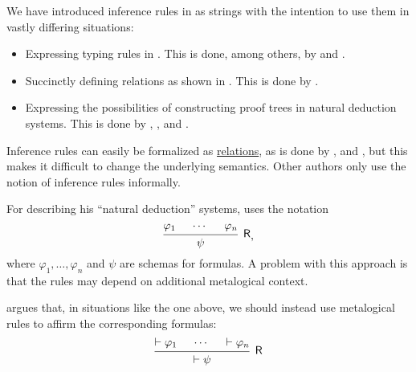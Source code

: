 \begin{remark}\label{rem:inference_rules_semantics}
  We have introduced inference rules in  as strings with the intention to use them in vastly differing situations:
  \begin{itemize}
    \item Expressing typing rules in . This is done, among others, by  and .
    \item Succinctly defining relations as shown in . This is done by .
    \item Expressing the possibilities of constructing proof trees in natural deduction systems. This is done by , ,  and .
  \end{itemize}

  Inference rules can easily be formalized as \hyperref[def:relation]{relations}, as is done by ,  and , but this makes it difficult to change the underlying semantics. Other authors only use the notion of inference rules informally.

  For describing his \enquote{natural deduction} systems,  uses the notation
  \begin{equation*}
    \begin{prooftree}
      \hypo{ \varphi_1 }
      \hypo{ \cdots }
      \hypo{ \varphi_n }
      \infer3[\logic{R}]{ \psi }
    \end{prooftree},
  \end{equation*}
  where \( \varphi_1, \ldots, \varphi_n \) and \( \psi \) are schemas for formulas. A problem with this approach is that the rules may depend on additional metalogical context.

   argues that, in situations like the one above, we should instead use metalogical rules to affirm the corresponding formulas:
  \begin{equation*}
    \begin{prooftree}
      \hypo{ \vdash \varphi_1 }
      \hypo{ \cdots }
      \hypo{ \vdash \varphi_n }
      \infer3[\logic{R}]{ \vdash \psi }
    \end{prooftree}
  \end{equation*}


\end{remark}
